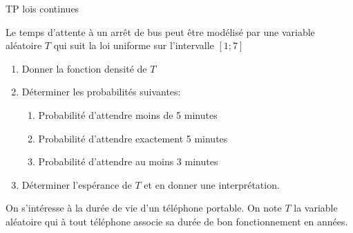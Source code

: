 \documentclass[a4paper,12pt,openany]{book}
\begin{document}
\begin{center}\begin{huge}
TP lois continues
\end{huge}\end{center}


\exo

\medskip

Le temps d'attente à un arrêt de bus peut être modélisé par une variable aléatoire $T$ qui suit la loi uniforme sur l'intervalle $[1;7]$

\medskip

\begin{enumerate}
	\item Donner la fonction densité de $T$
	
	\cadre{
\vspace{1.5cm}\hspace{18cm}
}

	\item Déterminer les probabilités suivantes:
	\begin{enumerate}
		\item Probabilité d'attendre moins de 5 minutes
		
		\cadre{
\vspace{1.5cm}\hspace{18cm}
}

		\item Probabilité d'attendre exactement 5 minutes
		
		\cadre{
\vspace{1.5cm}\hspace{18cm}
}
		\item Probabilité d'attendre au moins 3 minutes
		
		\cadre{
\vspace{1.5cm}\hspace{18cm}
}
	\end{enumerate}
	\item Déterminer l'espérance de $T$ et en donner une interprétation.
	
	\cadre{
\vspace{1.5cm}\hspace{18cm}
}
\end{enumerate}


\bigskip

\newpage
\exo

\medskip

On s'intéresse à la durée de vie d'un téléphone portable. On note $T$ la variable aléatoire qui à tout téléphone associe sa durée de bon fonctionnement en années.
\end{document}
